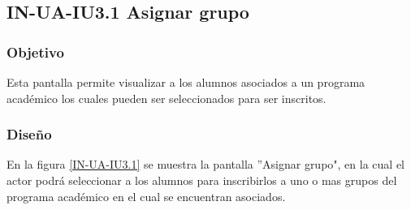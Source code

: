 \subsection{IN-UA-IU3.1 Asignar grupo}

\subsubsection{Objetivo}
	
	Esta pantalla permite visualizar a los alumnos asociados a un programa académico los cuales pueden ser seleccionados para ser inscritos.

\subsubsection{Diseño}

    En la figura \ref{IN-UA-IU3.1} se muestra la pantalla ''Asignar grupo", en la cual el actor podrá seleccionar a los alumnos para inscribirlos a uno o mas grupos del programa académico en el cual se encuentran asociados.
            
